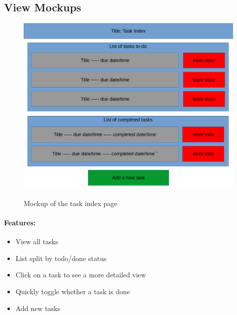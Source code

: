 \documentclass{article}
\begin{document}
\subsection{View Mockups}
\begin{minipage}{0.5\textwidth}
	\begin{figure}[H]
		\includegraphics[width=\linewidth]{Mockups/task_index.png}
		\label{fig:task_index_mockup}
		\caption{Mockup of the task index page}
	\end{figure}
\end{minipage} \hfill
\begin{minipage}{0.45\textwidth}
	\paragraph{Features:}
	\begin{itemize}
		\item View all tasks
		\item List split by todo/done status
		\item Click on a task to see a more detailed view
		\item Quickly toggle whether a task is done
		\item Add new tasks
	\end{itemize}
\end{minipage}
\end{document}
